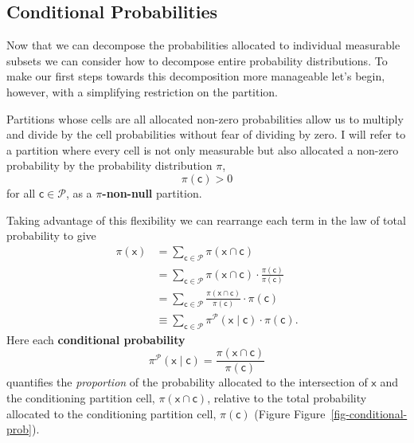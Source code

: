 \documentclass[
  letterpaper,
  DIV=11,
  numbers=noendperiod]{scrartcl}
\begin{document}
\subsection{Conditional Probabilities}\label{conditional-probabilities}

Now that we can decompose the probabilities allocated to individual
measurable subsets we can consider how to decompose entire probability
distributions. To make our first steps towards this decomposition more
manageable let's begin, however, with a simplifying restriction on the
partition.

Partitions whose cells are all allocated non-zero probabilities allow us
to multiply and divide by the cell probabilities without fear of
dividing by zero. I will refer to a partition where every cell is not
only measurable but also allocated a non-zero probability by the
probability distribution \(\pi\), \[
\pi(\mathsf{c}) > 0
\] for all \(\mathsf{c} \in \mathcal{P}\), as a
\textbf{\(\pi\)-non-null} partition.

Taking advantage of this flexibility we can rearrange each term in the
law of total probability to give \begin{align*}
\pi( \mathsf{x} )
&=
\sum_{\mathsf{c} \in \mathcal{P}} \pi( \mathsf{x} \cap \mathsf{c} )
\\
&=
\sum_{\mathsf{c} \in \mathcal{P}} \pi( \mathsf{x} \cap \mathsf{c} )
\cdot \frac{ \pi( \mathsf{c} ) }{ \pi( \mathsf{c} ) }
\\
&=
\sum_{\mathsf{c} \in \mathcal{P}}
\frac{ \pi(\mathsf{x} \cap \mathsf{c}) }{ \pi ( \mathsf{c} ) }
\cdot \pi( \mathsf{c} )
\\
&\equiv
\sum_{\mathsf{c} \in \mathcal{P}}
\pi^{\mathcal{P}}( \mathsf{x} \mid \mathsf{c} )
\cdot \pi( \mathsf{c} ).
\end{align*} Here each \textbf{conditional probability} \[
\pi^{\mathcal{P}}( \mathsf{x} \mid \mathsf{c} ) =
\frac{ \pi(\mathsf{x} \cap \mathsf{c}) }{ \pi (\mathsf{c}) }
\] quantifies the \emph{proportion} of the probability allocated to the
intersection of \(\mathsf{x}\) and the conditioning partition cell,
\(\pi(\mathsf{x} \cap \mathsf{c})\), relative to the total probability
allocated to the conditioning partition cell, \(\pi( \mathsf{c} )\)
(Figure Figure~\ref{fig-conditional-prob}).
\end{document}
